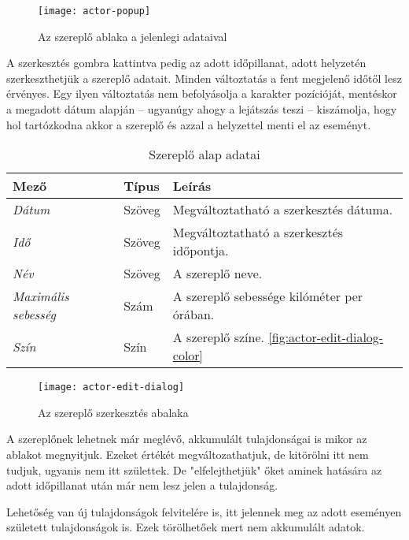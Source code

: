 \begin{figure}[h!]
	\centering
	\texttt{[image: actor-popup]}
	\caption{Az szereplő ablaka a jelenlegi adataival}
	\label{fig:actor-popup}
\end{figure}

A szerkesztés gombra kattintva pedig az adott időpillanat, adott helyzetén szerkeszthetjük a szereplő adatait. Minden változtatás a fent megjelenő időtől lesz érvényes. Egy ilyen változtatás nem befolyásolja a karakter pozícióját, mentéskor a megadott dátum alapján -- ugyanúgy ahogy a lejátszás teszi -- kiszámolja, hogy hol tartózkodna akkor a szereplő és azzal a helyzettel menti el az eseményt.

\begin{table}[H]
	\centering
	\begin{tabular}{ | m{} | m{} | m{} | }
		\hline
		\textbf{Mező} & \textbf{Típus} & \textbf{Leírás} \\
		\hline \hline
		\emph{Dátum} & Szöveg & Megváltoztatható a szerkesztés dátuma. \\
		\hline
		\emph{Idő} & Szöveg & Megváltoztatható a szerkesztés időpontja. \\
		\hline
		\emph{Név} & Szöveg & A szereplő neve.  \\
		\hline
		\emph{Maximális sebesség} & Szám & A szereplő sebessége kilóméter per órában. \\
		\hline
		\emph{Szín} & Szín & A szereplő színe. \ref{fig:actor-edit-dialog-color}  \\
		\hline
	\end{tabular}
	\caption{Szereplő alap adatai}
	\label{tab:create-project-form}
\end{table}

\begin{figure}[h!]
	\centering
	\texttt{[image: actor-edit-dialog]}
	\caption{Az szereplő szerkesztés abalaka}
	\label{fig:actor-edit-dialog}
\end{figure}

A szereplőnek lehetnek már meglévő, akkumulált tulajdonságai is mikor az ablakot megnyitjuk. Ezeket értékét megváltozathatjuk, de kitörölni itt nem tudjuk, ugyanis nem itt születtek. De "elfelejthetjük" őket aminek hatására az adott időpillanat után már nem lesz jelen a tulajdonság.

Lehetőség van új tulajdonságok felvitelére is, itt jelennek meg az adott eseményen született tulajdonságok is. Ezek törölhetőek mert nem akkumulált adatok.

